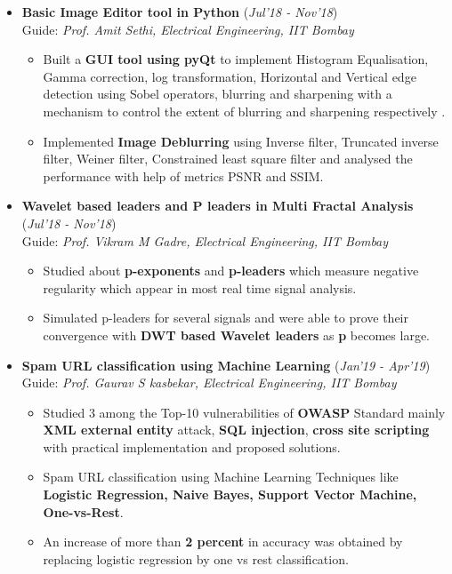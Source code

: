 \documentclass[10pt]{article}
\begin{document}
\begin{itemize}[leftmargin=0.4cm]
\item \textbf{Basic Image Editor tool in Python 
} 
\hfill{(\textit{Jul'18 - Nov'18})}\\
Guide: \textit{Prof. Amit Sethi, Electrical Engineering, IIT Bombay}
	\begin{itemize}
	\item Built a \textbf{GUI tool using pyQt} to implement Histogram Equalisation, Gamma correction, log transformation, Horizontal and Vertical edge detection using Sobel operators, blurring and sharpening with a mechanism to control the extent of blurring and sharpening respectively .
	\item Implemented \textbf{Image Deblurring} using Inverse filter, Truncated inverse filter, Weiner filter, Constrained least square filter and analysed the performance with help of metrics PSNR and SSIM.
	\end{itemize}


\item \textbf{Wavelet based leaders and P leaders in Multi
Fractal Analysis} 
\hfill{(\textit{Jul'18 - Nov'18})}\\
Guide: \textit{Prof. Vikram M Gadre, Electrical Engineering, IIT Bombay}
	\begin{itemize}
	\item Studied about \textbf{p-exponents} and \textbf{p-leaders} which measure negative regularity which appear in most real time signal analysis.
	\item Simulated p-leaders for several signals and were able to prove their convergence with \textbf{DWT based Wavelet leaders} as \textbf{p} becomes large.


	\end{itemize}
	

\item \textbf{Spam URL classification using Machine Learning}
\hfill{(\textit{Jan'19 - Apr'19})}\\
Guide: \textit{Prof. Gaurav S kasbekar, Electrical Engineering, IIT Bombay}

	\begin{itemize}
	\item Studied 3 among the Top-10 vulnerabilities of \textbf{OWASP} Standard mainly \textbf{XML external entity} attack, \textbf{SQL injection}, \textbf{cross site scripting} with practical implementation and proposed solutions.
	\item Spam URL classification using Machine Learning Techniques like \textbf{Logistic Regression, Naive Bayes, Support Vector Machine, One-vs-Rest}.
	\item An increase of more than \textbf{2 percent} in accuracy was obtained by replacing logistic regression by one vs rest classification.
    \end{itemize}

	


\end{itemize}
\hspace{-0.17cm}\colorbox{bl}{}%
	 
\end{document}
